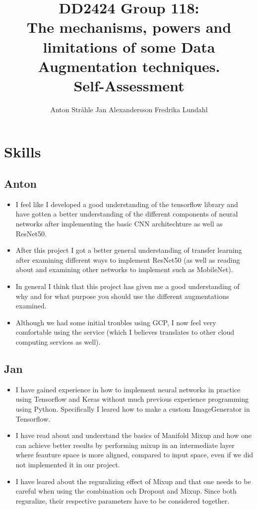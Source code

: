 \documentclass{article}
\title{DD2424 Group 118: \\ The mechanisms, powers and limitations of some Data Augmentation techniques. \\ Self-Assessment}
\author{%
  Anton Stråhle \And Jan Alexandersson \And Fredrika Lundahl}
\begin{document}
	
\maketitle

\section*{Skills}

\subsection*{Anton}

\begin{itemize}
 \item I feel like I developed a good understanding of the tensorflow library and have gotten a better understanding of the different components of neural networks after implementing the basic CNN architechture as well as ResNet50. 
 \item After this project I got a better general understanding of transfer learning after examining different ways to implement ResNet50 (as well as reading about and examining other networks to implement such as MobileNet). 
 \item In general I think that this project has given me a good understanding of why and for what purpose you should use the different augmentations examined.
 \item Although we had some initial troubles using GCP, I now feel very comfortable using the service (which I believes translates to other cloud computing services as well).
\end{itemize}


\subsection*{Jan}

\begin{itemize}
  \item I have gained experience in how to implement neural networks in practice using Tensorflow and Keras without much previous experience programming using Python. Specifically I leared how to make a custom ImageGenerator in Tensorflow.

  \item I have read about and understand the basics of Manifold Mixup and how one can achieve better results by performing mixup in an intermediate layer where feauture space is more aligned, compared to input space, even if we did not implemented it in our project.

  \item I have leared about the reguralizing effect of Mixup and that one needs to be careful when using the combination och Dropout and Mixup. Since both reguralize, their respective parameters have to be considered together.
\end{itemize}
\end{document}
